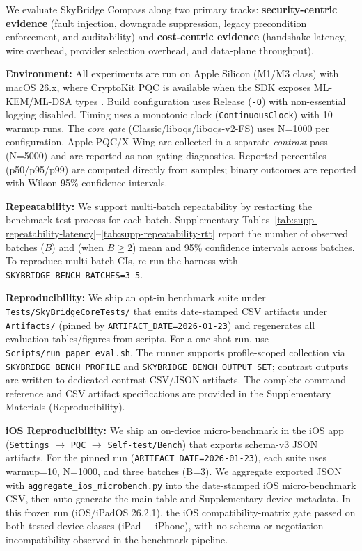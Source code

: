 \documentclass[10pt,journal,compsoc]{IEEEtran}
\newcommand{\artifactdate}{2026-01-23}
\begin{document}
We evaluate SkyBridge Compass along two primary tracks:
\textbf{security-centric evidence} (fault injection, downgrade
suppression, legacy precondition enforcement, and auditability) and
\textbf{cost-centric evidence} (handshake latency, wire overhead,
provider selection overhead, and data-plane throughput).

\textbf{Environment:} All experiments are run on Apple Silicon (M1/M3 class) with macOS 26.x, where CryptoKit PQC is available when the SDK exposes ML-KEM/ML-DSA types \cite{ref1,ref34}. Build configuration uses Release (\texttt{-O}) with non-essential logging disabled. Timing uses a monotonic clock (\texttt{ContinuousClock}) with 10 warmup runs. The \emph{core gate} (Classic/liboqs/liboqs-v2-FS) uses N=1000 per configuration. Apple PQC/X-Wing are collected in a separate \emph{contrast} pass (N=5000) and are reported as non-gating diagnostics. Reported percentiles (p50/p95/p99) are computed directly from samples; binary outcomes are reported with Wilson 95\% confidence intervals.

\textbf{Repeatability:} We support multi-batch repeatability by
restarting the benchmark test process for each batch. Supplementary
Tables~\ref{tab:supp-repeatability-latency}--\ref{tab:supp-repeatability-rtt}
report the number of observed batches ($B$) and (when $B \ge 2$) mean and
95\% confidence intervals across batches. To reproduce multi-batch CIs,
re-run the harness with \texttt{SKYBRIDGE\_BENCH\_BATCHES=3}--\texttt{5}.

\textbf{Reproducibility:} We ship an opt-in benchmark suite under \texttt{Tests/\allowbreak SkyBridgeCoreTests/} that emits date-stamped CSV artifacts under \texttt{Artifacts/} (pinned by \texttt{ARTIFACT\_DATE=\artifactdate}) and regenerates all evaluation tables/figures from scripts. For a one-shot run, use \texttt{Scripts/\allowbreak run\_\allowbreak paper\_\allowbreak eval.sh}. The runner supports profile-scoped collection via \texttt{SKYBRIDGE\_BENCH\_PROFILE} and \texttt{SKYBRIDGE\_BENCH\_OUTPUT\_SET}; contrast outputs are written to dedicated contrast CSV/JSON artifacts. The complete command reference and CSV artifact specifications are provided in the Supplementary Materials (Reproducibility).

\textbf{iOS Reproducibility:} We ship an on-device micro-benchmark in
the iOS app (\texttt{Settings} $\rightarrow$ \texttt{PQC} $\rightarrow$
\texttt{Self-test/Bench}) that exports schema-v3 JSON artifacts.
For the pinned run (\texttt{ARTIFACT\_DATE=\artifactdate}), each suite uses
warmup=10, N=1000, and three batches (B=3). We aggregate exported JSON
with \texttt{aggregate\_ios\_microbench.py} into the date-stamped iOS
micro-benchmark CSV, then auto-generate the main table and Supplementary
device metadata. In this frozen run
(iOS/iPadOS 26.2.1), the iOS compatibility-matrix gate passed on both
tested device classes (iPad + iPhone), with no schema or negotiation
incompatibility observed in the benchmark pipeline.
\end{document}
